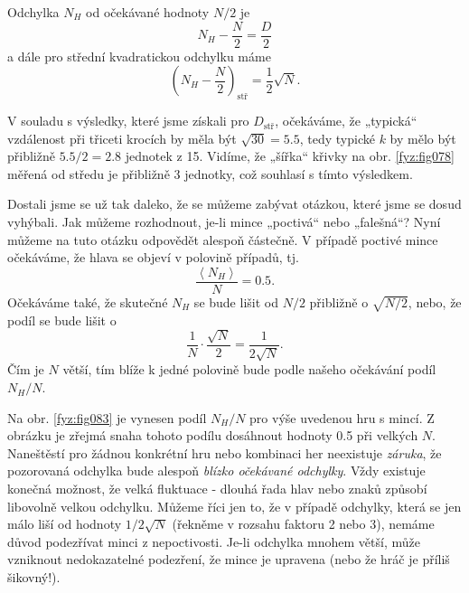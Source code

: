     Odchylka \(N_H\) od očekávané hodnoty \(N/2\) je
    \begin{equation}\label{fyz:eq081}
      N_H - \frac{N}{2} = \frac{D}{2}
    \end{equation}
    a dále pro střední kvadratickou odchylku máme
    \begin{equation}\label{fyz:eq082}
      \left(N_H - \frac{N}{2}\right)_\text{stř} = \frac{1}{2}\sqrt{N}.
    \end{equation}
    
    V souladu s výsledky, které jsme získali pro \(D_{\text{stř}}\), očekáváme, že „typická“ 
    vzdálenost při třiceti krocích by měla být \(\sqrt{30} = \num{5.5}\), tedy typické \(k\) by 
    mělo být přibližně \(\num{5.5}/2 = \num{2.8}\) jednotek z \num{15}. Vidíme, že „šířka“ křivky 
    na obr. \ref{fyz:fig078} měřená od středu je přibližně \num{3} jednotky, což souhlasí s tímto 
    výsledkem.
    
    Dostali jsme se už tak daleko, že se můžeme zabývat otázkou, které jsme se dosud vyhýbali. Jak 
    můžeme rozhodnout, je-li mince „poctivá“ nebo „falešná“? Nyní můžeme na tuto otázku odpovědět 
    alespoň částečně. V případě poctivé mince očekáváme, že hlava se objeví v polovině případů, tj.
    \begin{equation}\label{fyz:eq083}
      \frac{\left\langle N_H\right\rangle}{N} = \num{0.5}.
    \end{equation}
    Očekáváme také, že skutečné \(N_H\) se bude lišit od \(N/2\) přibližně o \(\sqrt{N/2}\), nebo, 
    že podíl se bude lišit o
    \begin{equation}\label{fyz:eq084}
      \frac{1}{N}\cdot\frac{\sqrt{N}}{2} = \frac{1}{2\sqrt{N}}.
    \end{equation}
    Čím je \(N\) větší, tím blíže k jedné polovině bude podle našeho očekávání podíl \(N_H/N\).
    
    Na obr. \ref{fyz:fig083} je vynesen podíl \(N_H/N\) pro výše uvedenou hru s mincí. Z obrázku je 
    zřejmá snaha tohoto podílu dosáhnout hodnoty \num{0.5} při velkých \(N\). Naneštěstí pro žádnou 
    konkrétní hru nebo kombinaci her neexistuje \emph{záruka}, že pozorovaná odchylka bude alespoň 
    \emph{blízko očekávané odchylky}. Vždy existuje konečná možnost, že velká fluktuace - dlouhá 
    řada hlav nebo znaků způsobí libovolně velkou odchylku. Můžeme říci jen to, že v případě 
    odchylky, která se jen málo liší od hodnoty \(1/2\sqrt{N}\) (řekněme v rozsahu faktoru \num{2} 
    nebo \num{3}), nemáme důvod podezřívat minci z nepoctivosti. Je-li odchylka mnohem větší, může 
    vzniknout nedokazatelné podezření, že mince je upravena (nebo že hráč je příliš šikovný!).
    
